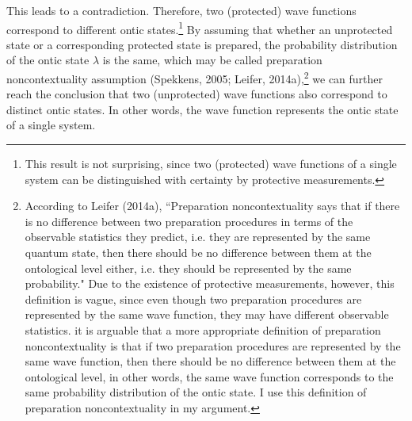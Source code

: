 This leads to a contradiction. Therefore, two (protected) wave functions correspond to different ontic states.\footnote{This result is not surprising, since two (protected) wave functions of a single system can be distinguished with certainty by protective measurements.} By assuming that whether an unprotected state or a corresponding protected state is prepared, the probability distribution of the ontic state $\lambda$ is the same, which may be called preparation noncontextuality assumption (Spekkens, 2005; Leifer, 2014a),\footnote{According to Leifer (2014a), ``Preparation noncontextuality says that if there is no difference between two preparation procedures in terms of the observable statistics they predict, i.e. they are represented by the same quantum state, then there should be no difference between them at the ontological level either, i.e. they should be represented by the same probability." Due to the existence of protective measurements, however, this definition is vague, since even though two preparation procedures are represented by the same wave function, they may have different observable statistics. it is arguable that a more appropriate definition of preparation noncontextuality is that if two preparation procedures are represented by the same wave function, then there should be no difference between them at the ontological level, in other words, the same wave function corresponds to the same probability distribution of the ontic state. I use this definition of preparation noncontextuality in my argument.} we can further reach the conclusion that two (unprotected) wave functions also correspond to distinct ontic states. In other words, the wave function represents the ontic state of a single  system.

